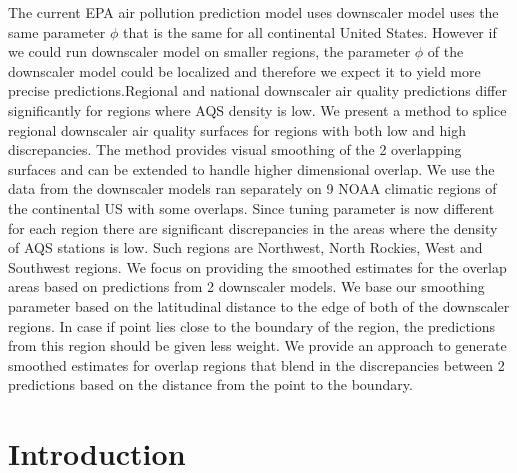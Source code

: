 \documentclass[10pt]{article}
\theoremstyle{plain}
\theoremstyle{definition}
\theoremstyle{remark}
\begin{document}
\justify
The current EPA air pollution prediction model uses downscaler model uses the same parameter $\phi$ that is the same for all continental United States. However if we could run downscaler model on smaller regions, the parameter $\phi$ of the downscaler model could be localized and therefore we expect it to yield more precise predictions.Regional and national downscaler air quality predictions differ significantly for regions where AQS density is low. We present a method to splice regional downscaler air quality surfaces for regions with both low and high discrepancies.  The method provides visual smoothing of the 2 overlapping surfaces and can be extended to handle higher dimensional overlap.  We use the data from the downscaler models ran separately on 9 NOAA climatic regions of the continental US with some overlaps. Since tuning parameter is now different for each region there are significant discrepancies in the areas where the density of AQS stations is low. Such regions are Northwest, North Rockies, West and Southwest regions. 
We focus on providing the smoothed estimates for the overlap areas based on predictions from 2 downscaler models. We base our smoothing parameter based on the latitudinal distance to the edge of both of the downscaler regions. In case if point lies close to the boundary of the region, the predictions from this region should be given less weight. 
We provide an approach to generate smoothed estimates for overlap regions that blend in the discrepancies between 2 predictions based on the distance from the point to the boundary.

\section{Introduction}
\end{document}

